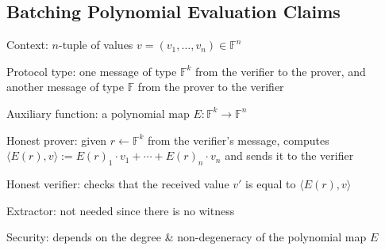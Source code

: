 \subsection{Batching Polynomial Evaluation Claims}

Context: $n$-tuple of values $v = (v_1, \ldots, v_n) \in \mathbb{F}^n$

Protocol type: one message of type $\mathbb{F}^k$ from the verifier to the prover, and another message of type $\mathbb{F}$ from the prover to the verifier

Auxiliary function: a polynomial map $E : \mathbb{F}^k \to \mathbb{F}^n$

Honest prover: given $r \gets \mathbb{F}^k$ from the verifier's message, computes $\langle E(r), v\rangle := E(r)_1 \cdot v_1 + \cdots + E(r)_n \cdot v_n$ and sends it to the verifier

Honest verifier: checks that the received value $v'$ is equal to $\langle E(r), v\rangle$

Extractor: not needed since there is no witness

Security: depends on the degree \& non-degeneracy of the polynomial map $E$